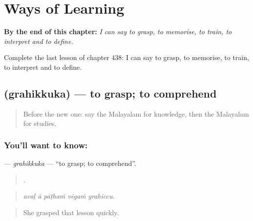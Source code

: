 
\chapter{Ways of Learning}
\label{ch:ml-ways-of-learning}

\begin{chapteropening}
\textbf{By the end of this chapter:} \emph{I can say to grasp, to memorise, to train, to interpret and to define.}

Complete the last lesson of chapter 438: I can say to grasp, to memorise, to train, to interpret and to define.
\end{chapteropening}

\section[\texorpdfstring{\ml{ഗ്രഹിക്കുക} (grahikkuka)}{ഗ്രഹിക്കുക (grahikkuka)}]{ (grahikkuka) — to grasp; to comprehend}

\label{lesson:ML-C438-grahikkuka}



\begin{quote}
Before the new one: say the Malayalam for knowledge, then the Malayalam for studies.
\end{quote}

\subsection*{You'll want to know: }
\textbf{} — \emph{grahikkuka} — \textquotedblleft{}to grasp; to comprehend\textquotedblright{}.

\begin{quote}
    .
\end{quote}

\begin{quote}
\emph{avaḷ ā pāṭhaṁ vēgaṁ grahiccu.}
\end{quote}

\begin{quote}
She grasped that lesson quickly.
\end{quote}

